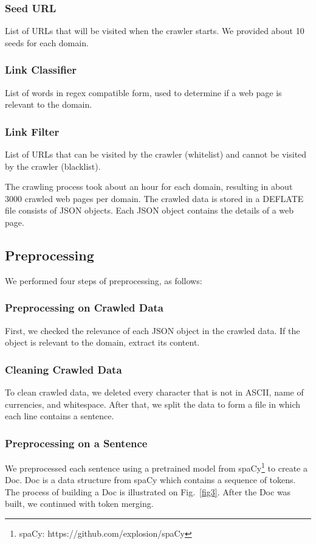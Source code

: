 \documentclass[a4paper,conference]{IEEEtran}
\begin{document}
\subsubsection{Seed URL}
List of URLs that will be visited when the crawler starts. We provided about 10 seeds for each domain.

\subsubsection{Link Classifier}
List of words in regex compatible form, used to determine if a web page is relevant to the domain.

\subsubsection{Link Filter}
List of URLs that can be visited by the crawler (whitelist) and cannot be visited by the crawler (blacklist).

The crawling process took about an hour for each domain, resulting in about 3000 crawled web pages per domain. The crawled data is stored in a DEFLATE file consists of JSON objects. Each JSON object contains the details of a web page.

\subsection{Preprocessing}

We performed four steps of preprocessing, as follows:
\subsubsection{Preprocessing on Crawled Data}
First, we checked the relevance of each JSON object in the crawled data. If the object is relevant to the domain, extract its content.

\subsubsection{Cleaning Crawled Data}
To clean crawled data, we deleted every character that is not in ASCII, name of currencies, and whitespace. After that, we split the data to form a file in which each line contains a sentence.

\subsubsection{Preprocessing on a Sentence}
We preprocessed each sentence using a pretrained model from spaCy\footnote{spaCy: https://github.com/explosion/spaCy} to create a Doc. Doc is a data structure from spaCy which contains a sequence of tokens. The process of building a Doc is illustrated on Fig.~\ref{fig3}. After the Doc was built, we continued with token merging.
\end{document}
